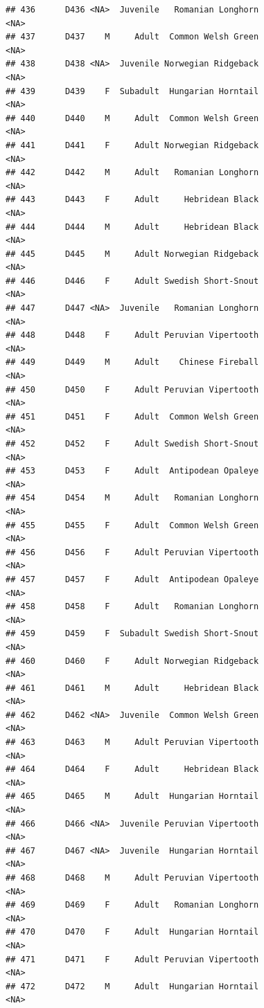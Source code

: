 \documentclass[
]{book}
\begin{document}
\begin{verbatim}
## 436      D436 <NA>  Juvenile   Romanian Longhorn                <NA>
## 437      D437    M     Adult  Common Welsh Green                <NA>
## 438      D438 <NA>  Juvenile Norwegian Ridgeback                <NA>
## 439      D439    F  Subadult  Hungarian Horntail                <NA>
## 440      D440    M     Adult  Common Welsh Green                <NA>
## 441      D441    F     Adult Norwegian Ridgeback                <NA>
## 442      D442    M     Adult   Romanian Longhorn                <NA>
## 443      D443    F     Adult     Hebridean Black                <NA>
## 444      D444    M     Adult     Hebridean Black                <NA>
## 445      D445    M     Adult Norwegian Ridgeback                <NA>
## 446      D446    F     Adult Swedish Short-Snout                <NA>
## 447      D447 <NA>  Juvenile   Romanian Longhorn                <NA>
## 448      D448    F     Adult Peruvian Vipertooth                <NA>
## 449      D449    M     Adult    Chinese Fireball                <NA>
## 450      D450    F     Adult Peruvian Vipertooth                <NA>
## 451      D451    F     Adult  Common Welsh Green                <NA>
## 452      D452    F     Adult Swedish Short-Snout                <NA>
## 453      D453    F     Adult  Antipodean Opaleye                <NA>
## 454      D454    M     Adult   Romanian Longhorn                <NA>
## 455      D455    F     Adult  Common Welsh Green                <NA>
## 456      D456    F     Adult Peruvian Vipertooth                <NA>
## 457      D457    F     Adult  Antipodean Opaleye                <NA>
## 458      D458    F     Adult   Romanian Longhorn                <NA>
## 459      D459    F  Subadult Swedish Short-Snout                <NA>
## 460      D460    F     Adult Norwegian Ridgeback                <NA>
## 461      D461    M     Adult     Hebridean Black                <NA>
## 462      D462 <NA>  Juvenile  Common Welsh Green                <NA>
## 463      D463    M     Adult Peruvian Vipertooth                <NA>
## 464      D464    F     Adult     Hebridean Black                <NA>
## 465      D465    M     Adult  Hungarian Horntail                <NA>
## 466      D466 <NA>  Juvenile Peruvian Vipertooth                <NA>
## 467      D467 <NA>  Juvenile  Hungarian Horntail                <NA>
## 468      D468    M     Adult Peruvian Vipertooth                <NA>
## 469      D469    F     Adult   Romanian Longhorn                <NA>
## 470      D470    F     Adult  Hungarian Horntail                <NA>
## 471      D471    F     Adult Peruvian Vipertooth                <NA>
## 472      D472    M     Adult  Hungarian Horntail                <NA>

\end{verbatim}
\end{document}
